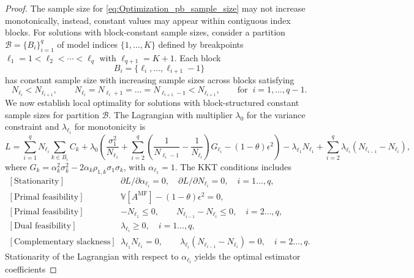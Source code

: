 \begin{proof}
The sample size for \eqref{eq:Optimization_pb_sample_size} may not increase monotonically, instead, constant values may appear within contiguous index blocks. For solutions with block-constant sample sizes, consider a partition $\mathscr{B} = \{B_i\}_{i=1}^q$ of model indices $\{1,\ldots,K\}$ defined by breakpoints $\ell_1=1 < \ell_2 < \cdots < \ell_q$ with $\ell_{q+1} = K+1$. Each block 
% 
\[
B_i = \{\ell_i, \ldots, \ell_{i+1}-1\}
\]
%
has constant sample size with increasing sample sizes across blocks satisfying
%
\begin{equation}\label{eq:sample_size_block}
    N_{\ell_i} < N_{\ell_{i+1}},\quad\quad  N_{\ell_i}=N_{\ell_i+1}=\ldots = N_{\ell_{i+1}-1} <N_{\ell_{i+1}}, \qquad \text{for}\;\;  i=1,\ldots,q-1.
\end{equation}
%
We now establish local optimality for solutions with block-structured constant sample sizes for partition $\mathscr{B}$. The Lagrangian with multiplier $\lambda_0$ for the variance constraint and $\lambda_{\ell_i}$ for monotonicity is
%
\begin{equation*}
L= \sum_{i=1}^q N_{\ell_i}\sum_{k\in B_i} C_k +\lambda_0 \left(\frac{\sigma_1^2}{N_{\ell_1}} + \sum_{i=2}^q \left(\frac{1}{N_{\ell_i-1}} - \frac{1}{N_{\ell_i}}\right)G_{\ell_i}- (1-\theta)\epsilon^2\right)-\lambda_{\ell_1} N_{\ell_1}+\sum_{i=2}^q\lambda_{\ell_{i}}(N_{\ell_{i-1}} - N_{\ell_{i}}),
\end{equation*}
%
where $G_k = \alpha_k^2\sigma_k^2 - 2\alpha_k\rho_{1,k}\sigma_1\sigma_k$, with $\alpha_{\ell_1} = 1$.
The KKT conditions includes
%
\[
\begin{array}{ll}
\left[\text{Stationarity}\right]&\partial L/\partial \alpha_{\ell_i}=0,\quad \partial L/{\partial N_{\ell_i}}=0,\quad i=1\ldots,q,\\
\left[\text{Primal feasibility}\right]&\mathbb{V}\left[A^{\text{MF}}\right]- (1-\theta)\epsilon^2 = 0, \\ 
\left[\text{Primal feasibility}\right] &-N_{\ell_1}\le 0,\qquad N_{\ell_{i-1}}-N_{\ell_i} \le 0, \quad i=2\ldots,q,\\ 
\left[\text{Dual feasibility}\right]  &\lambda_{\ell_i} \ge 0,\quad i=1\ldots,q, \\ 
\left[\text{Complementary slackness}\right]  &\lambda_{\ell_1} N_{\ell_1}=0,\qquad\lambda_{\ell_i}(N_{\ell_{i-1}}-N_{\ell_i})=0,\quad i=2\ldots,q.
\end{array}
\]
%
Stationarity of the Lagrangian with respect to $\alpha_{\ell_i}$ yields the optimal estimator coefficients

\end{proof}

